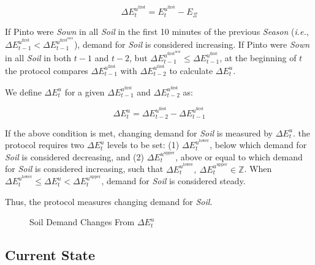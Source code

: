 \documentclass[tikz]{article}
\newcommand{\term}[1]{\textsl{#1}}
\begin{document}
    $$
        \Delta E_{t}^{u^{\text{first}}} = 
            E_{t}^{u^{\text{first}}} - E_{\Xi}
    $$

If Pinto were \term{Sown} in all \term{Soil} in the first 10 minutes of the previous \term{Season} (\textit{i.e.}, $\Delta E_{t-1}^{u^{\text{first}}} < \Delta E_{t-1}^{u^{\text{first}^{\text{max}}}}$), demand for \term{Soil} is considered increasing. If Pinto were \term{Sown} in all \term{Soil} in both $t-1$ and $t-2$, but $\Delta E_{t-1}^{u^{\text{first}^{\text{max}}}} \leq \Delta E_{t-1}^{u^{\text{first}}}$, at the beginning of $t$ the protocol compares $\Delta E_{t-1}^{u^{\text{first}}}$ with $\Delta E_{t-2}^{u^{\text{first}}}$ to calculate $\Delta E_{t}^{u}$.

We define $\Delta E_{t}^{u}$ for a given $\Delta E_{t-1}^{u^{\text{first}}}$ and $\Delta E_{t-2}^{u^{\text{first}}}$ as:

    $$
        \Delta E_{t}^{u} = 
            \Delta E_{t-2}^{u^{\text{first}}} - \Delta E_{t-1}^{u^{\text{first}}}
    $$

If the above condition is met, changing demand for \term{Soil} is measured by $\Delta E_{t}^{u}$. the protocol requires two $\Delta E_{t}^{u}$ levels to be set: (1) $\Delta E_{t}^{u^{\text{lower}}}$, below which demand for \term{Soil} is considered decreasing, and (2) $\Delta E_{t}^{u^{\text{upper}}}$, above or equal to which demand for \term{Soil} is considered increasing, such that $\Delta E_{t}^{u^{\text{lower}}},\ \Delta E_{t}^{u^{\text{upper}}} \in \mathbb{Z}$. When $\Delta E_{t}^{u^{\text{lower}}} \leq \Delta E_{t}^{u} < \Delta E_{t}^{u^{\text{upper}}}$, demand for \term{Soil} is considered steady.

Thus, the protocol measures changing demand for \term{Soil}.


\begin{figure}[h!]
    \centering
    
    \vspace*{-10.5mm} %
    \setlength{\belowcaptionskip}{-8pt} %
    \caption{Soil Demand Changes From $\Delta E_{t}^{u}$}
    \label{Soil Demand Changes From Time}
\end{figure}


\subsection{Current State}
\end{document}
